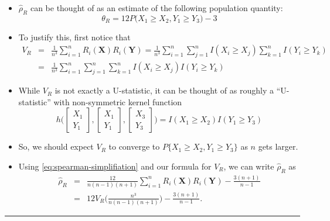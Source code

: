 \documentclass[]{book}
\begin{document}
\begin{itemize}
\item
  \(\hat{\rho}_{R}\) can be thought of as an estimate of the following population
  quantity:
  \begin{equation}
  \theta_{R} = 12 P\Big( X_{1} \geq X_{2}, Y_{1} \geq Y_{3} \Big) - 3
  \end{equation}
\item
  To justify this, first notice that
  \begin{eqnarray}
  V_{R} &=& \frac{1}{n^{3}}\sum_{i=1}^{n} R_{i}(\mathbf{X})R_{i}(\mathbf{Y})
  = \frac{1}{n^{3}}\sum_{i=1}^{n} \sum_{j=1}^{n} I(X_{i} \geq X_{j}) \sum_{k=1}^{n} I(Y_{i} \geq Y_{k}) \nonumber \\
  &=& \frac{1}{n^{3}}\sum_{i=1}^{n} \sum_{j=1}^{n} \sum_{k=1}^{n} I(X_{i} \geq X_{j}) I(Y_{i} \geq Y_{k})  \nonumber
  \end{eqnarray}
\item
  While \(V_{R}\) is not exactly a U-statistic, it can be thought of as roughly a ``U-statistic'' with non-symmetric kernel function
  \begin{equation}
  h\Bigg( \begin{bmatrix} X_{1} \\ Y_{1} \end{bmatrix}, \begin{bmatrix} X_{1} \\ Y_{1} \end{bmatrix},
  \begin{bmatrix} X_{3} \\ Y_{3} \end{bmatrix} \Bigg) = I(X_{1} \geq X_{2}) I(Y_{1} \geq Y_{3}) \nonumber
  \end{equation}
\item
  So, we should expect \(V_{R}\) to converge to \(P\{X_{1} \geq X_{2}, Y_{1} \geq Y_{3}\}\) as \(n\) gets larger.
\item
  Using \eqref{eq:spearman-simplifiation} and our formula for \(V_{R}\), we can write \(\hat{\rho}_{R}\) as
  \begin{eqnarray}
  \hat{\rho}_{R} &=& \frac{12}{n(n-1)(n+1)}\sum_{i=1}^{n} R_{i}( \mathbf{X} )R_{i}(\mathbf{Y}) - \frac{3(n+1)}{n-1} \nonumber \\
  &=& 12 V_{R} \Big( \frac{n^{3}}{n(n-1)(n+1)} \Big)  - \frac{3(n+1)}{n-1}. \nonumber
  \end{eqnarray}
\end{itemize}

\begin{center}\rule{0.5\linewidth}{\linethickness}\end{center}
\end{document}
